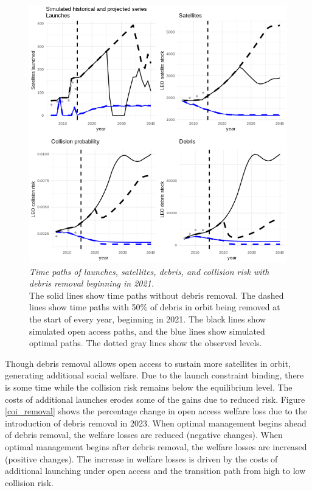 \documentclass[12pt]{article}
\begin{document}
\begin{figure}[H]
	\centering
	\includegraphics[width=\textwidth]{../../images/remcomp7_starts_simulated_projected_series_optstart_2006_remfrac_05_remstart_2021.png}
	\captionsetup{format=hang}
	\caption[Satellite and debris paths with debris removal in 2021]{\textit{Time paths of launches, satellites, debris, and collision risk with debris removal beginning in 2021.} \\
		The solid lines show time paths without debris removal. The dashed lines show time paths with 50\% of debris in orbit being removed at the start of every year, beginning in 2021. The black lines show simulated open access paths, and the blue lines show simulated optimal paths. The dotted gray lines show the observed levels. \\
	}
	\label{removal_intro}
\end{figure}

Though debris removal allows open access to sustain more satellites in orbit, generating additional social welfare. Due to the launch constraint binding, there is some time while the collision risk remains below the equilibrium level. The costs of additional launches erodes some of the gains due to reduced risk. Figure \ref{coi_removal} shows the percentage change in open access welfare loss due to the introduction of debris removal in 2023. When optimal management begins ahead of debris removal, the welfare losses are reduced (negative changes). When optimal management begins after debris removal, the welfare losses are increased (positive changes). The increase in welfare losses is driven by the costs of additional launching under open access and the transition path from high to low collision risk.
\end{document}
